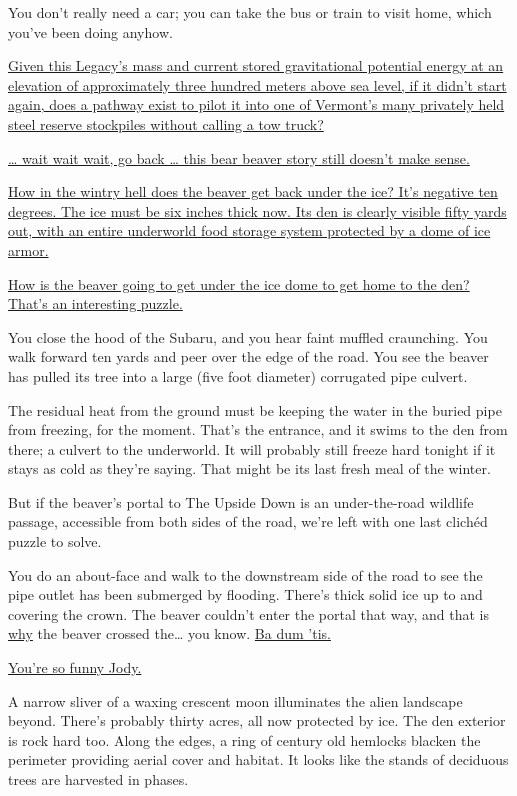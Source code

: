 \documentclass[17pt, twoside, a5paper, openright, extrafontsizes]{memoir}
\renewcommand{\emph}[1]{\ul{#1}}
\begin{document}
You don't really need a car; you can take the bus or train to visit
home, which you've been doing anyhow.

\emph{Given this Legacy's mass and current stored gravitational
potential energy at an elevation of approximately three hundred meters
above sea level, if it didn't start again, does a pathway exist to pilot
it into one of Vermont's many privately held steel reserve stockpiles
without calling a tow truck?}

\emph{\ldots{} wait wait wait, go back \ldots{} this bear beaver story
still doesn't make sense.}

\emph{How in the wintry hell does the beaver get back under the ice?
It's negative ten degrees. The ice must be six inches thick now. Its den
is clearly visible fifty yards out, with an entire underworld food
storage system protected by a dome of ice armor.}

\emph{How is the beaver going to get under the ice dome to get home to
the den? That's an interesting puzzle.}

You close the hood of the Subaru, and you hear faint muffled craunching.
You walk forward ten yards and peer over the edge of the road. You see
the beaver has pulled its tree into a large (five foot diameter)
corrugated pipe culvert.

The residual heat from the ground must be keeping the water in the
buried pipe from freezing, for the moment. That's the entrance, and it
swims to the den from there; a culvert to the underworld. It will
probably still freeze hard tonight if it stays as cold as they're
saying. That might be its last fresh meal of the winter.

But if the beaver's portal to The Upside Down is an under-the-road
wildlife passage, accessible from both sides of the road, we're left
with one last clichéd puzzle to solve.

You do an about-face and walk to the downstream side of the road to see
the pipe outlet has been submerged by flooding. There's thick solid ice
up to and covering the crown. The beaver couldn't enter the portal that
way, and that is \emph{why} the beaver crossed the\ldots{} you know.
\emph{Ba dum 'tis.}

\emph{You're so funny Jody.}

A narrow sliver of a waxing crescent moon illuminates the alien
landscape beyond. There's probably thirty acres, all now protected by
ice. The den exterior is rock hard too. Along the edges, a ring of
century old hemlocks blacken the perimeter providing aerial cover and
habitat. It looks like the stands of deciduous trees are harvested in
phases.
\end{document}
